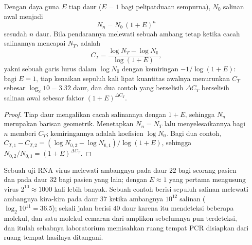 \begin{theorem}\label{thm:b3:genetic-engineering:pcr}
Dengan daya guna $E$ tiap daur ($E = 1$ bagi pelipatduaan sempurna), $N_{0}$
salinan awal menjadi
\[
N_{n} = N_{0}\,(1 + E)^{n}
\]
sesudah $n$ daur. Bila pendarannya melewati sebuah ambang tetap ketika
cacah salinannya mencapai $N_{T}$, \emph{} adalah
\[
C_{T} = \frac{\log N_{T} - \log N_{0}}{\log(1 + E)},
\]
yakni sebuah garis lurus dalam $\log N_{0}$ dengan kemiringan
$-1/\log(1+E)$: bagi $E = 1$, tiap kenaikan sepuluh kali lipat kuantitas
awalnya menurunkan $C_{T}$ sebesar $\log_{2} 10 = 3.32$ daur, dan dua contoh
yang  berselisih $\Delta C_{T}$ berselisih salinan awal
sebesar faktor $(1 + E)^{\Delta C_{T}}$.
\end{theorem}
\begin{proof}
Tiap daur mengalikan cacah salinannya dengan $1 + E$, sehingga $N_{n}$
merupakan barisan geometrik. Menetapkan $N_{n} = N_{T}$ lalu menyelesaikannya
bagi $n$ memberi $C_{T}$; kemiringannya adalah koefisien $\log N_{0}$. Bagi
dua contoh, $C_{T,1} - C_{T,2} = (\log N_{0,2} - \log N_{0,1})/\log(1+E)$,
sehingga $N_{0,2}/N_{0,1} = (1+E)^{\Delta C_{T}}$.
\end{proof}

\begin{example}\label{ex:b3:genetic-engineering:qpcr}
Sebuah uji RNA virus melewati ambangnya pada daur $22$ bagi seorang pasien
dan pada daur $32$ bagi pasien yang lain; dengan $E \approx 1$ yang pertama
mengusung virus $2^{10}
\approx 1000$ kali lebih banyak. Sebuah contoh berisi sepuluh salinan melewati
ambangnya kira-kira pada daur $37$ ketika ambangnya $10^{12}$ salinan ($\log_{2} 10^{11} =
36.5$); sekali jalan berisi $40$ daur karena itu mendeteksi beberapa molekul,
dan satu molekul cemaran dari amplikon sebelumnya pun terdeteksi, dan itulah
sebabnya laboratorium memisahkan ruang tempat PCR disiapkan dari ruang tempat
hasilnya ditangani.
\end{example}

